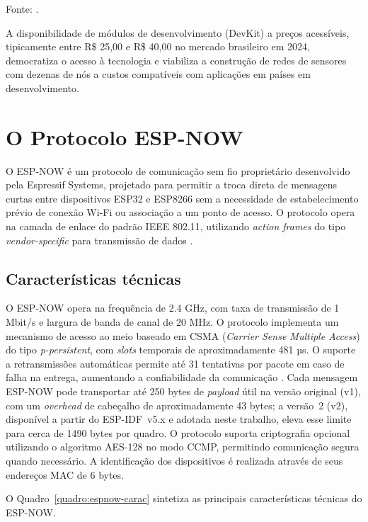 Fonte: .

A disponibilidade de módulos de desenvolvimento (DevKit) a preços
acessíveis, tipicamente entre R\$ 25,00 e R\$ 40,00 no mercado
brasileiro em 2024, democratiza o acesso à tecnologia e viabiliza a construção
de redes de sensores com dezenas de nós a custos compatíveis com
aplicações em países em desenvolvimento.

\section{O Protocolo ESP-NOW}\label{o-protocolo-esp-now}

O ESP-NOW é um protocolo de comunicação sem fio proprietário
desenvolvido pela Espressif Systems, projetado para permitir a troca
direta de mensagens curtas entre dispositivos ESP32 e ESP8266 sem a
necessidade de estabelecimento prévio de conexão Wi-Fi ou associação a
um ponto de acesso. O protocolo opera na camada de enlace do padrão IEEE
802.11, utilizando \emph{action frames} do tipo \emph{vendor-specific}
para transmissão de dados \cite{becker2025}.

\subsection{Características
técnicas}\label{caracteruxedsticas-tuxe9cnicas}

O ESP-NOW opera na frequência de 2.4 GHz, com taxa de transmissão de 1
Mbit/s e largura de banda de canal de 20 MHz. O protocolo implementa um
mecanismo de acesso ao meio baseado em CSMA (\emph{Carrier Sense
Multiple Access}) do tipo \emph{p-persistent}, com \emph{slots}
temporais de aproximadamente 481 µs. O suporte a retransmissões
automáticas permite até 31 tentativas por pacote em caso de falha na
entrega, aumentando a confiabilidade da comunicação \cite{becker2025}.
Cada mensagem ESP-NOW pode transportar até 250 bytes de \emph{payload}
útil na versão original (v1), com um \emph{overhead} de cabeçalho de
aproximadamente 43 bytes; a versão~2 (v2), disponível a partir do ESP-IDF~v5.x e
adotada neste trabalho, eleva esse limite para cerca de 1490 bytes por quadro. O
protocolo suporta criptografia opcional utilizando o algoritmo AES-128
no modo CCMP, permitindo comunicação segura quando necessário. A
identificação dos dispositivos é realizada através de seus endereços MAC
de 6 bytes.

O Quadro~\ref{quadro:espnow-carac} sintetiza as principais características técnicas do ESP-NOW.

